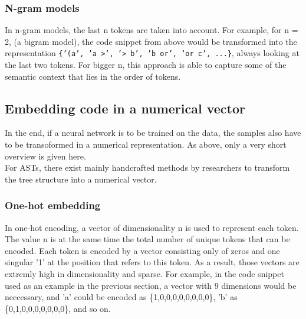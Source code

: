 \documentclass[
	a4paper,
	pagesize,
	pdftex,
	12pt,
	twoside, %
	BCOR=5mm, %
	ngerman,
	fleqn,
	final,
	]{scrartcl}
\begin{document}
\subsubsection{N-gram models}\label{n-gram}
In n-gram models, the last n tokens are taken into account. For example, for n = 2, (a bigram model), the code snippet from above would be transformed into the representation \texttt{\{'(a', 'a >', '> b', 'b or', 'or c', ...\}}, always looking at the last two tokens. For bigger n, this approach is able to capture some of the semantic context that lies in the order of tokens.

\subsection{Embedding code in a numerical vector}
In the end, if a neural network is to be trained on the data, the samples also have to be transoformed in a numerical representation. As above, only a very short overview is given here.\\
For ASTs, there exist mainly handcrafted methods by researchers to transform the tree structure into a numerical vector.
\subsubsection{One-hot embedding}
In one-hot encoding, a vector of dimensionality n is used to represent each token. The value n is at the same time the total number of unique tokens that can be encoded. Each token is encoded by a vector consisting only of zeros and one singular '1' at the position that refers to this token. As a result, those vectors are extremly high in dimensionality and sparse. For example, in the code snippet used as an example in the previous section, a vector with 9 dimensions would be neccessary, and 'a' could be encoded as \{1,0,0,0,0,0,0,0,0\}, 'b' as \{0,1,0,0,0,0,0,0,0\}, and so on.
\end{document}
